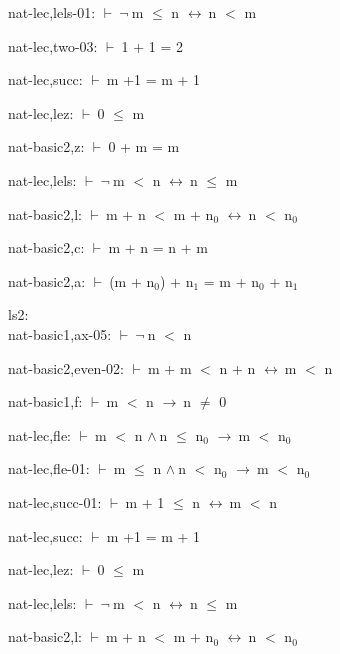 \documentclass[a4paper]{article}
\newcommand{\Fol}{\mbox{$\vdash\ $}}
\newcommand{\Not}{\mbox{$\neg\ $}}
\newcommand{\And}{\mbox{$\wedge\ $}}
\newcommand{\Imp}{\mbox{$\rightarrow\ $}}
\newcommand{\Equiv}{\mbox{$\leftrightarrow\ $}}
\begin{document}
nat-lec,lels-01: 
 \Fol \Not m $\le$ n \Equiv n $<$ m



nat-lec,two-03: 
 \Fol 1 + 1 = 2



nat-lec,succ: 
 \Fol m +1 = m + 1



nat-lec,lez: 
 \Fol 0 $\le$ m



nat-basic2,z: 
 \Fol 0 + m = m



nat-lec,lels: 
 \Fol \Not m $<$ n \Equiv n $\le$ m



nat-basic2,l: 
 \Fol m + n $<$ m + $\mbox{n}_{0}$ \Equiv n $<$ $\mbox{n}_{0}$



nat-basic2,c: 
 \Fol m + n = n + m



nat-basic2,a: 
 \Fol (m + $\mbox{n}_{0}$) + $\mbox{n}_{1}$ = m + $\mbox{n}_{0}$ + $\mbox{n}_{1}$



\bigskip

ls2:\\ nat-basic1,ax-05: 
 \Fol \Not n $<$ n



nat-basic2,even-02: 
 \Fol m + m $<$ n + n \Equiv m $<$ n



nat-basic1,f: 
 \Fol m $<$ n \Imp n $\neq$ 0



nat-lec,fle: 
 \Fol m $<$ n \And n $\le$ $\mbox{n}_{0}$ \Imp m $<$ $\mbox{n}_{0}$



nat-lec,fle-01: 
 \Fol m $\le$ n \And n $<$ $\mbox{n}_{0}$ \Imp m $<$ $\mbox{n}_{0}$



nat-lec,succ-01: 
 \Fol m + 1 $\le$ n \Equiv m $<$ n



nat-lec,succ: 
 \Fol m +1 = m + 1



nat-lec,lez: 
 \Fol 0 $\le$ m



nat-lec,lels: 
 \Fol \Not m $<$ n \Equiv n $\le$ m



nat-basic2,l: 
 \Fol m + n $<$ m + $\mbox{n}_{0}$ \Equiv n $<$ $\mbox{n}_{0}$
\end{document}
